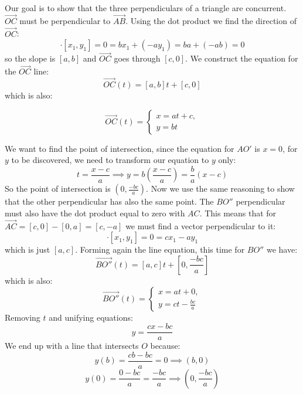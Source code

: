 \documentclass{article}
\begin{document}
Our goal is to show that the three perpendiculars of a triangle are concurrent. \(\overrightarrow{OC}\) must be perpendicular
to \(\overrightarrow{AB}\). Using the dot product we find the direction of \(\overrightarrow{OC}\):
\begin{equation*}
    [b, -a] \cdot [x_1, y_1] = 0 = bx_{1} + (-ay_{1}) = ba + (-ab) = 0
\end{equation*}
so the slope is \([a, b]\) and \(\overrightarrow{OC}\) goes through \([c, 0]\). We construct the equation for the \(\overrightarrow{OC}\) line:
\begin{equation*}
    \overrightarrow{OC}(t) = [a, b]t + [c, 0]
\end{equation*}
which is also:

\begin{equation*}
    \overrightarrow{OC}(t) = 
            \begin{cases}
                x = at + c,\\
                y = bt
            \end{cases}
\end{equation*}

We want to find the point of intersection, since the equation for \(AO'\) is \(x = 0\), for \(y\) to be discovered, we need
to transform our equation to \(y\) only:
\begin{equation*}
    t = \frac{x - c}{a} \implies y = b(\frac{x - c}{a}) = \frac{b}{a}(x-c)
\end{equation*}
So the point of intersection is \((0, \frac{-bc}{a})\). Now we use the same reasoning to show that the other perpendicular
has also the same point. The \(BO''\) perpendicular must also have the dot product equal to zero with \(AC\). This means that
for  \(\overrightarrow{AC} = [c, 0] - [0, a] = [c, -a]\) we must find a vector perpendicular to it:
\begin{equation*}
    [c, -a] \cdot [x_1, y_1] = 0 = cx_{1} -ay_{1}
\end{equation*}
which is just \([a, c]\). Forming again the line equation, this time for \(BO''\) we have:
\begin{equation*}
    \overrightarrow{BO''}(t) = [a, c]t + [0, \frac{-bc}{a}]
\end{equation*}
which is also:
\begin{equation*}
    \overrightarrow{BO''}(t) = 
            \begin{cases}
                x = at + 0,\\
                y = ct - \frac{bc}{a}
            \end{cases}
\end{equation*}
Removing \(t\) and unifying equations:
\begin{equation*}
    y = \frac{cx - bc}{a}
\end{equation*}
We end up with a line that intersects \(O\) because:
\begin{equation*}
    y(b) = \frac{cb - bc}{a} = 0 \implies (b, 0)
\end{equation*}
\begin{equation*}
    y(0) = \frac{0 - bc}{a} = \frac{-bc}{a} \implies (0, \frac{-bc}{a})
\end{equation*}
\end{document}
